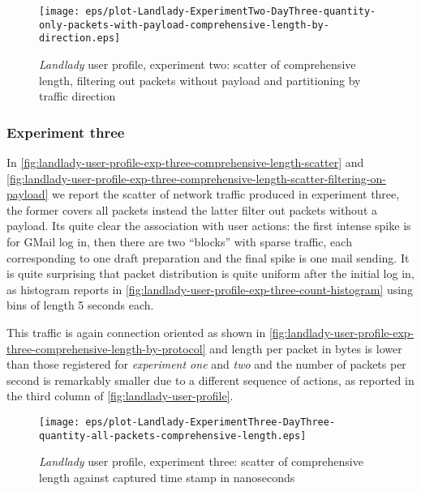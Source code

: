 \documentclass[10pt,a4paper]{article}
\begin{document}
    \begin{figure}
      \centering
      \texttt{[image: eps/plot-Landlady-ExperimentTwo-DayThree-quantity-only-packets-with-payload-comprehensive-length-by-direction.eps]}
      \caption{\emph{Landlady} user profile, experiment two: scatter
        of comprehensive length, filtering out packets without payload
        and partitioning by traffic direction}
      \label{fig:landlady-user-profile-exp-two-comprehensive-length-by-direction}
    \end{figure}



    \subsubsection*{Experiment three}
    In
    \autoref{fig:landlady-user-profile-exp-three-comprehensive-length-scatter}
    and
    \autoref{fig:landlady-user-profile-exp-three-comprehensive-length-scatter-filtering-on-payload}
    we report the scatter of network traffic produced in experiment
    three, the former covers all packets instead the latter filter out
    packets without a payload. Its quite clear the association with
    user actions: the first intense spike is for GMail log in, then
    there are two ``blocks'' with sparse traffic, each corresponding
    to one draft preparation and the final spike is one mail
    sending. It is quite surprising that packet distribution is quite
    uniform after the initial log in, as histogram reports in
    \autoref{fig:landlady-user-profile-exp-three-count-histogram}
    using bins of length 5 seconds each.

    This traffic is again connection oriented as shown in
    \autoref{fig:landlady-user-profile-exp-three-comprehensive-length-by-protocol}
    and length per packet in bytes is lower than those registered for
    \emph{experiment one} and \emph{two} and the number of packets per
    second is remarkably smaller due to a different sequence of
    actions, as reported in the third column of
    \autoref{fig:landlady-user-profile}.

    \begin{figure}
      \centering
      \texttt{[image: eps/plot-Landlady-ExperimentThree-DayThree-quantity-all-packets-comprehensive-length.eps]}
      \caption{\emph{Landlady} user profile, experiment three: scatter
        of comprehensive length against captured time stamp in
        nanoseconds}
      \label{fig:landlady-user-profile-exp-three-comprehensive-length-scatter}
    \end{figure}
\end{document}

